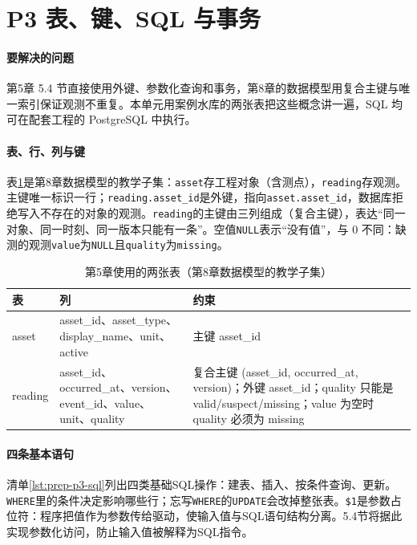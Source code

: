 \section{P3 表、键、SQL 与事务}
\label{app:prep-p3}

\paragraph{要解决的问题}第5章 5.4 节直接使用外键、参数化查询和事务，第8章的数据模型用复合主键与唯一索引保证观测不重复。本单元用案例水库的两张表把这些概念讲一遍，SQL 均可在配套工程的 PostgreSQL 中执行。

\paragraph{表、行、列与键}表\ref{tab:prep-p3-tables}是第8章数据模型的教学子集：\texttt{asset}存工程对象（含测点），\texttt{reading}存观测。主键唯一标识一行；\texttt{reading.asset\_id}是外键，指向\texttt{asset.asset\_id}，数据库拒绝写入不存在的对象的观测。\texttt{reading}的主键由三列组成（复合主键），表达“同一对象、同一时刻、同一版本只能有一条”。空值\texttt{NULL}表示“没有值”，与 0 不同：缺测的观测\texttt{value}为\texttt{NULL}且\texttt{quality}为\texttt{missing}。

\begin{table}[htbp]
\centering
\caption{第5章使用的两张表（第8章数据模型的教学子集）}
\label{tab:prep-p3-tables}
\begin{tabular}{p{1.6cm}p{5.2cm}p{6.4cm}}
\toprule
表 & 列 & 约束 \\
\midrule
asset & asset\_id、asset\_type、display\_name、unit、active & 主键 asset\_id \\
reading & asset\_id、occurred\_at、version、event\_id、value、unit、quality & 复合主键 (asset\_id, occurred\_at, version)；外键 asset\_id；quality 只能是 valid/suspect/missing；value 为空时 quality 必须为 missing \\
\bottomrule
\end{tabular}
\end{table}

\paragraph{四条基本语句}清单\ref{lst:prep-p3-sql}列出四类基础SQL操作：建表、插入、按条件查询、更新。\texttt{WHERE}里的条件决定影响哪些行；忘写\texttt{WHERE}的\texttt{UPDATE}会改掉整张表。\texttt{\$1}是参数占位符：程序把值作为参数传给驱动，使输入值与SQL语句结构分离。5.4节将据此实现参数化访问，防止输入值被解释为SQL指令。

